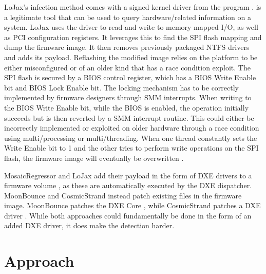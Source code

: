LoJax's infection method comes with a signed kernel driver from the program .
 is a legitimate tool that can be used to query hardware\-/related information on a system.
LoJax uses the driver to read and write to memory mapped \ac{I/O}, as well as \ac{PCI} configuration registers.
It leverages this to find the \ac{SPI} flash mapping and dump the firmware image.
It then removes previously packaged \ac{NTFS} drivers and adds its payload.
Reflashing the modified image relies on the platform to be either misconfigured or of an older kind that has a race condition exploit.
The \ac{SPI} flash is secured by a \ac{BIOS} control register, which has a \ac{BIOS} Write Enable bit and \ac{BIOS} Lock Enable bit.
The locking mechanism has to be correctly implemented by firmware designers through \ac{SMM} interrupts.
When writing to the \ac{BIOS} Write Enable bit, while the \ac{BIOS} is enabled, the operation initially succeeds but is then reverted by a \ac{SMM} interrupt routine.
This could either be incorrectly implemented or exploited on older hardware through a race condition using multi\-/processing or multi\-/threading.
When one thread constantly sets the Write Enable bit to 1 and the other tries to perform write operations on the \ac{SPI} flash, the firmware image will eventually be overwritten \cite{lojax}.

MosaicRegressor and LoJax add their payload in the form of \ac{DXE} drivers to a firmware volume \cite{mosaicregressor-technical-details,lojax}, as these are automatically executed by the \ac{DXE} dispatcher.
MoonBounce and CosmicStrand instead patch existing files in the firmware image.
MoonBounce patches the \ac{DXE} Core \cite{moonbounce}, while CosmicStrand patches a \ac{DXE} driver \cite{cosmicstrand}.
While both approaches could fundamentally be done in the form of an added \ac{DXE} driver, it does make the detection harder.

\section{Approach}

